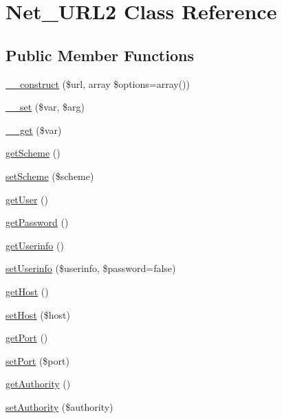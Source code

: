 \hypertarget{classNet__URL2}{\section{Net\-\_\-\-U\-R\-L2 Class Reference}
\label{classNet__URL2}
}
\subsection*{Public Member Functions}
\begin{DoxyCompactItemize}
\item 
\hyperlink{classNet__URL2_a4c12ff0ddce6621148a4917b8040e567}{\-\_\-\-\_\-construct} (\$url, array \$options=array())
\item 
\hyperlink{classNet__URL2_ae2489e2f59be30883c898bc46ffbf9a1}{\-\_\-\-\_\-set} (\$var, \$arg)
\item 
\hyperlink{classNet__URL2_a6f7109a2d04198fafac837cae9d5c3ff}{\-\_\-\-\_\-get} (\$var)
\item 
\hyperlink{classNet__URL2_a9ebbd0b1bc71024ce48593cb1faeff41}{get\-Scheme} ()
\item 
\hyperlink{classNet__URL2_aadd3865f996d98703ec9bbdecfda4ba1}{set\-Scheme} (\$scheme)
\item 
\hyperlink{classNet__URL2_ad06292db039e4723ce457f416fc61763}{get\-User} ()
\item 
\hyperlink{classNet__URL2_a8cfbc773d2c8bb6727da1526770c4b9a}{get\-Password} ()
\item 
\hyperlink{classNet__URL2_a9249aba1b6b07ac8f992033cc865a455}{get\-Userinfo} ()
\item 
\hyperlink{classNet__URL2_a0e71d3ae85320e8e3ee181b49a11721b}{set\-Userinfo} (\$userinfo, \$password=false)
\item 
\hyperlink{classNet__URL2_a55343faf36c62fb1942229c00c53e42c}{get\-Host} ()
\item 
\hyperlink{classNet__URL2_afacc7bf64786203c167c2d771f1fddf9}{set\-Host} (\$host)
\item 
\hyperlink{classNet__URL2_a3684482beddce2747c3ef0cb5c3e9c64}{get\-Port} ()
\item 
\hyperlink{classNet__URL2_a4086e17a9dc2744b451ed0e5cc6fe113}{set\-Port} (\$port)
\item 
\hyperlink{classNet__URL2_af736dde13f102618a706c1cb47868b38}{get\-Authority} ()
\item 
\hyperlink{classNet__URL2_a9da06e86831f84fa7fba91e81e051160}{set\-Authority} (\$authority)
\item 

\end{DoxyCompactItemize}

